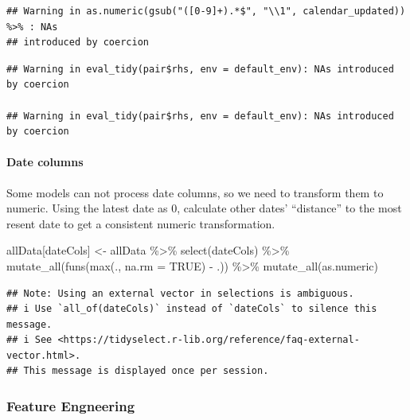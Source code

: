 \documentclass[
]{article}
\newenvironment{Shaded}{\begin{snugshade}}{\end{snugshade}}
\newcommand{\AttributeTok}[1]{\textcolor[rgb]{0.77,0.63,0.00}{#1}}
\newcommand{\ConstantTok}[1]{\textcolor[rgb]{0.00,0.00,0.00}{#1}}
\newcommand{\FunctionTok}[1]{\textcolor[rgb]{0.00,0.00,0.00}{#1}}
\newcommand{\NormalTok}[1]{#1}
\newcommand{\OtherTok}[1]{\textcolor[rgb]{0.56,0.35,0.01}{#1}}
\newcommand{\SpecialCharTok}[1]{\textcolor[rgb]{0.00,0.00,0.00}{#1}}
\begin{document}
\begin{verbatim}
## Warning in as.numeric(gsub("([0-9]+).*$", "\\1", calendar_updated)) %>% : NAs
## introduced by coercion
\end{verbatim}

\begin{verbatim}
## Warning in eval_tidy(pair$rhs, env = default_env): NAs introduced by coercion

## Warning in eval_tidy(pair$rhs, env = default_env): NAs introduced by coercion
\end{verbatim}

\hypertarget{date-columns}{%
\paragraph{Date columns}\label{date-columns}}

Some models can not process date columns, so we need to transform them
to numeric. Using the latest date as 0, calculate other dates'
``distance'' to the most resent date to get a consistent numeric
transformation.

\begin{Shaded}
\begin{Highlighting}[]
\NormalTok{allData[dateCols] }\OtherTok{\textless{}{-}}\NormalTok{ allData }\SpecialCharTok{\%\textgreater{}\%} 
  \FunctionTok{select}\NormalTok{(dateCols) }\SpecialCharTok{\%\textgreater{}\%} 
  \FunctionTok{mutate\_all}\NormalTok{(}\FunctionTok{funs}\NormalTok{(}\FunctionTok{max}\NormalTok{(., }\AttributeTok{na.rm =} \ConstantTok{TRUE}\NormalTok{) }\SpecialCharTok{{-}}\NormalTok{ .)) }\SpecialCharTok{\%\textgreater{}\%} 
  \FunctionTok{mutate\_all}\NormalTok{(as.numeric)}
\end{Highlighting}
\end{Shaded}

\begin{verbatim}
## Note: Using an external vector in selections is ambiguous.
## i Use `all_of(dateCols)` instead of `dateCols` to silence this message.
## i See <https://tidyselect.r-lib.org/reference/faq-external-vector.html>.
## This message is displayed once per session.
\end{verbatim}

\hypertarget{feature-engneering}{%
\subsubsection{Feature Engneering}\label{feature-engneering}}
\end{document}
